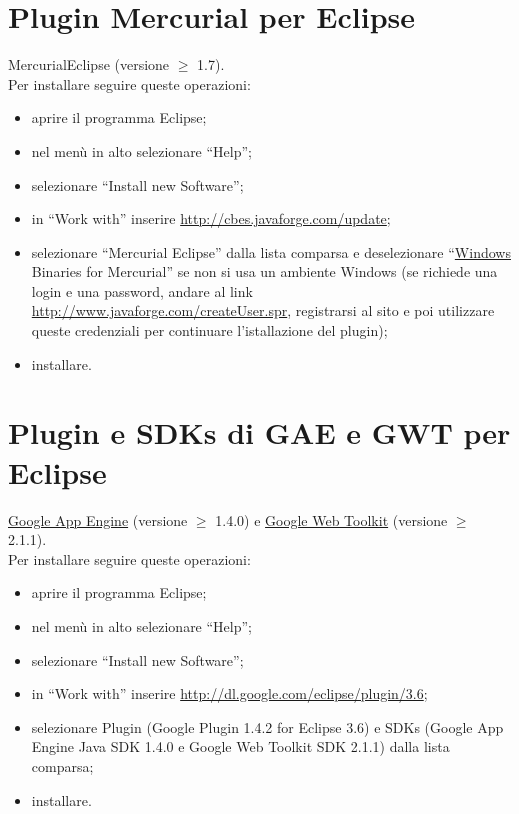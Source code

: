 \section{Plugin Mercurial per Eclipse}
MercurialEclipse (versione $\geq$ 1.7). 
\\
Per installare seguire queste
operazioni: 
\begin{itemize}
\item {aprire il programma Eclipse;} 
\item {nel men\`u in alto selezionare ``Help'';}
\item {selezionare ``Install new Software'';}
\item {in ``Work with'' inserire \url{http://cbes.javaforge.com/update};}
\item {selezionare ``Mercurial Eclipse'' dalla lista comparsa e deselezionare
``\underline{Windows} Binaries for Mercurial'' se non si usa un ambiente Windows
(se richiede una login e una password, andare al link
\url{http://www.javaforge.com/createUser.spr}, registrarsi al sito e poi
utilizzare queste credenziali per continuare l'istallazione del plugin);}
\item {installare.}
\end{itemize}

\section{Plugin e SDKs di GAE e GWT per Eclipse}
\underline{Google App Engine} (versione $\geq$ 1.4.0) e \underline{Google Web
Toolkit} (versione $\geq$ 2.1.1).
\\
Per installare seguire queste
operazioni: 
\begin{itemize}
\item {aprire il programma Eclipse;} 
\item {nel men\`u in alto selezionare ``Help'';}
\item {selezionare ``Install new Software'';}
\item {in ``Work with'' inserire \url{http://dl.google.com/eclipse/plugin/3.6};}
\item {selezionare Plugin (Google Plugin 1.4.2 for Eclipse 3.6) e SDKs (Google
App Engine Java SDK 1.4.0 e Google Web Toolkit SDK 2.1.1) dalla lista comparsa;}
\item {installare.}
\end{itemize} 

